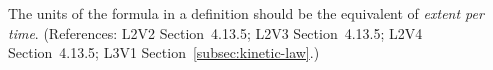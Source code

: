 The units of the  formula in a \KineticLaw definition should be
the equivalent of \emph{extent per time}.  (References: L2V2
Section~4.13.5; L2V3 Section~4.13.5; L2V4 Section~4.13.5; L3V1 Section~\ref{subsec:kinetic-law}.)
